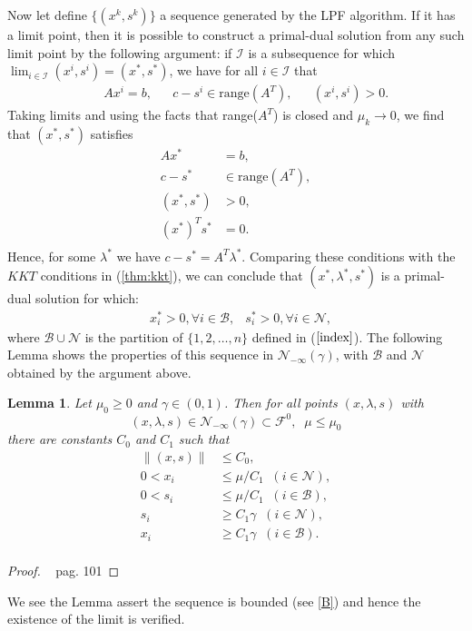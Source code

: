 \documentclass[a4paper,10 pt,titlepage,twoside]{book}
\theoremstyle{plain}
\newtheorem{lem}[thm]{Lemma}
\theoremstyle{definition}
\theoremstyle{remark}
\begin{document}
Now let define $\{(x^{k},s^{k})\}$ a sequence generated by the LPF algorithm. If it has a limit point, then it is possible to construct a primal-dual solution from any such limit point by the following argument: if $\mathcal{I}$ is a subsequence for which $\lim_{i\in\mathcal{I}}(x^{i},s^{i})=(x^{*},s^{*})$, we have for all $i\in\mathcal{I}$ that
\begin{alignat*}
&&Ax^{i}= b, &&c - s^{i}\in \text{range}(A^{T}), &&(x^{i},s^{i})>0.
\end{alignat*}
Taking limits and using the facts that range($A^{T}$) is closed and $\mu_{k}\to 0$, we find that $(x^{*},s^{*})$ satisfies
\begin{align*}
Ax^{*}&= b,\\c-s^{*}&\in\text{range}(A^{T}),\\(x^{*},s^{*})&>0,\\(x^{*})^{T}s^{*}&=0.\\
\end{align*}
Hence, for some $\lambda^{*}$ we have $c-s^{*}= A^{T}\lambda^{*}$. Comparing these conditions with the $KKT$ conditions in (\ref{thm:kkt}), we can conclude that $(x^{*},\lambda^{*},s^{*})$ is a primal-dual solution for which:
\begin{align*}
&x^{*}_{i}>0, \forall i \in\mathcal{B},
&s^{*}_{i}>0, \forall i \in\mathcal{N},
\end{align*}
where $\mathcal{B}\cup\mathcal{N}$ is the partition of $\{1,2,\dots,n\}$ defined in ($\ref{index}$).
The following Lemma shows the properties of this sequence in $\mathcal{N}_{-\infty}(\gamma)$, with $\mathcal{B}$ and $\mathcal{N}$ obtained by the argument above.
\begin{lem}
	Let $\mu_{0}\geq 0$ and $\gamma\in(0,1)$. Then for all points $(x,\lambda,s)$ with
	\begin{equation*}
	(x,\lambda,s)\in\mathcal{N}_{-\infty}(\gamma)\subset\mathcal{F}^{0}, \;\; \mu \leq \mu_{0}
	\end{equation*}
	there are constants $C_{0}$ and $C_{1}$ such that
	\begin{align*}
	\lVert(x,s) \rVert&\leq C_{0},\tag{B}\label{B}\\0< x_{i}&\leq \mu/C_{1}\;\; (i \in\mathcal{N}),\\
	0< s_{i}&\leq \mu/C_{1}\;\; (i \in\mathcal{B}),\\ 
	s_{i}&\geq C_{1}\gamma \;\; (i \in\mathcal{N}),\\
	x_{i}&\geq C_{1}\gamma \;\; (i \in\mathcal{B}).\\
	\end{align*}
\end{lem}
\begin{proof}
	~\cite{Wright} pag. 101
\end{proof}
We see the Lemma assert the sequence is bounded (see \ref{B}) and hence the existence of the limit is verified.\\
\end{document}
